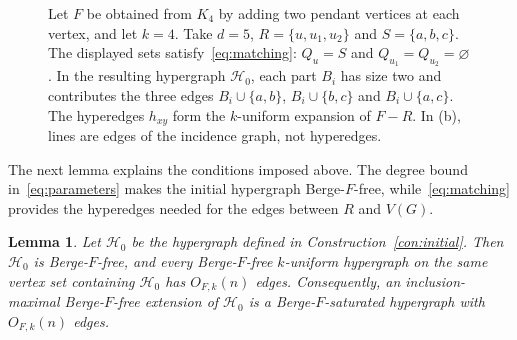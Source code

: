 \documentclass[11pt,a4paper]{article}
\numberwithin{equation}{section}
\newtheorem{lemma}[theorem]{Lemma}
\theoremstyle{definition}
\theoremstyle{plain}
\newcommand{\HH}{\mathcal H}
\begin{document}
\begin{figure}[!htbp]
\caption{Let $F$ be obtained from $K_4$ by adding two pendant vertices at
each vertex, and let $k=4$. Take $d=5$, $R=\{u,u_1,u_2\}$ and
$S=\{a,b,c\}$. The displayed sets satisfy~\eqref{eq:matching}:
$Q_u=S$ and $Q_{u_1}=Q_{u_2}=\varnothing$.
In the resulting hypergraph $\HH_0$, each part $B_i$ has size two
and contributes the three edges
$B_i\cup\{a,b\}$, $B_i\cup\{b,c\}$ and $B_i\cup\{a,c\}$.
The hyperedges $h_{xy}$ form the $k$-uniform expansion of $F-R$.
In (b), lines are edges of the incidence graph, not hyperedges.}
\label{fig:example}
\end{figure}

\FloatBarrier

The next lemma explains the conditions imposed above. The
degree bound in~\eqref{eq:parameters} makes the initial hypergraph
Berge-$F$-free, while~\eqref{eq:matching} provides the hyperedges needed
for the edges between $R$ and $V(G)$.

\begin{lemma}\label{lem:construction}
Let $\HH_0$ be the hypergraph defined in Construction~\ref{con:initial}.
Then $\HH_0$ is Berge-$F$-free, and every
Berge-$F$-free $k$-uniform hypergraph on the same vertex set containing
$\HH_0$ has $O_{F,k}(n)$ edges. Consequently, an inclusion-maximal
Berge-$F$-free extension of $\HH_0$ is a Berge-$F$-saturated hypergraph
with $O_{F,k}(n)$ edges.
\end{lemma}
\end{document}
